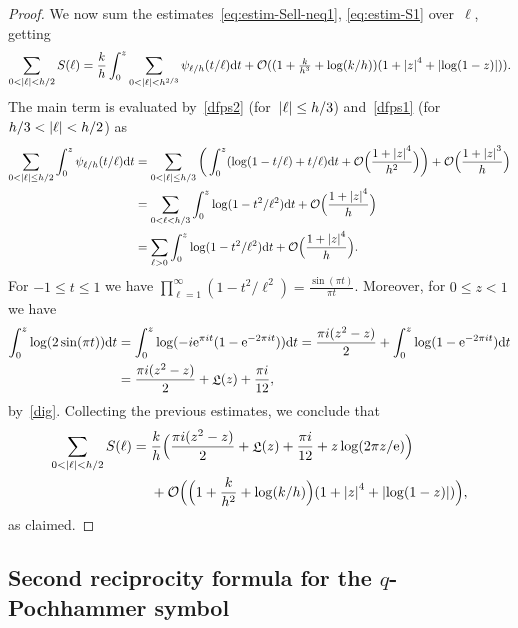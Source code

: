 \documentclass[11pt]{amsart}
\theoremstyle{definition}
\newcommand{\pr}[1]{\mathchoice{\left( #1\right)}{(#1)}{(#1)}{(#1)}}
\newcommand{\e}[1][]{\ifthenelse{\equal{#1}{}}{{\rm e}}{\operatorname{e}\pr{ #1}}}
\newcommand{\df}{\mathrm{d}}
\newcommand{\Oh}{\mathcal{O}}
\DeclareMathOperator{\Lie}{{\mathfrak L}}
\newcommand{\1}{{\mathbf 1}}
\newcommand{\abs}[1]{\left|#1\right|}
\let\originalleft\left
\let\originalright\right
\renewcommand{\left}{\mathopen{}\mathclose\bgroup\originalleft}
\renewcommand{\right}{\aftergroup\egroup\originalright}
\numberwithin{equation}{section}
\begin{document}
\begin{proof}
  We now sum the estimates~\eqref{eq:estim-Sell-neq1}, \eqref{eq:estim-S1} over~$\ell$, getting
  $$ \sum_{0<\abs{\ell}<h/2} S(\ell) = \frac{k}{h} \int_0^z \sum_{0<\abs{\ell}<h^{2/3}} \psi_{\ell/h}(t/\ell)\df t +
  \Oh((1 + \tfrac{k}{h^{3}} + \log(k/h))(1+\abs{z}^4+\abs{\log(1-z)})). $$
  The main term is evaluated by~\eqref{dfps2} (for~$\abs{\ell}\leq h/3$) and~\eqref{dfps1} (for~$h/3<\abs{\ell}<h/2$) as
  \begin{align*}
    \sum_{ 0<|\ell|\leq h/2}\int_0^z \psi_{\ell/h}(t/\ell)\df t&=  \sum_{ 0<|\ell|\leq h/3}\bigg(\int_0^z(\log(1-t/\ell)+t/\ell)\df t+ \Oh\Big(\frac{1+\abs{z}^4}{h^2}\Big)\bigg) + \Oh\Big(\frac{1+\abs{z}^3}{h}\Big) \\
    & =  \sum_{0<\ell<h/3}\int_0^z \log(1-t^2/\ell^2)\df t+ \Oh\Big(\frac{1+\abs{z}^4}{h}\Big) \\
    & =  \sum_{\ell>0}\int_0^z\log(1-t^2/\ell^2)\df t + \Oh\Big(\frac{1+\abs{z}^4}{h}\Big).
  \end{align*}
  For $-1\leq t\leq1$ we have $\prod_{\ell=1}^\infty (1-t^2/\ell^2)=\frac{\sin (\pi t)}{\pi t}$. Moreover, for $0\leq z<1$ we have
  \begin{align*}
    \int_{0}^{z}\log(2\sin(\pi t))\df t&=\int_{0}^{z}\log(-i\e^{\pi i t}(1-\e^{-2\pi i t}))\df t=\frac{\pi i (z^2-z)}{2}+\int_{0}^{z}\log(1-\e^{-2\pi i t})\df t\\
    &=\frac{\pi i (z^2-z)}{2}+\Lie(z)+\frac{\pi i }{12},
  \end{align*}
  by~\eqref{dig}. Collecting the previous estimates, we conclude that
  \begin{align*}
    \sum_{0 < \abs{\ell} < h/2} S(\ell) = {}& \frac kh\Big(\frac{\pi i (z^2-z)}{2}+\Lie(z)+\frac{\pi i }{12}+z \log(2 \pi z/\e)\Big) \\
    \qquad & + \Oh\Big(\Big(1 + \frac k{h^2} + \log(k/h)\Big)(1 + \abs{z}^4 + \abs{\log(1-z)}) \Big),
  \end{align*}
  as claimed.
\end{proof}



\subsection{Second reciprocity formula for the $q$-Pochhammer symbol}\label{sec:recip2-poch}
\end{document}

